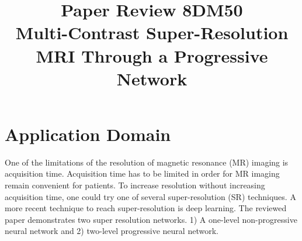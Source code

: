 \documentclass[conference]{IEEEtran}
\begin{document}
\title{Paper Review 8DM50 \\ Multi-Contrast Super-Resolution MRI Through a
  Progressive Network \cite{b1} }

\author{
\and
{}
\and
{}
\and
{}
\and
{}
}

\maketitle




\section{Application Domain}
One of the limitations of the resolution of magnetic resonance (MR) imaging is
acquisition time. Acquisition time has to be limited in order for MR imaging
remain convenient for patients. To increase resolution without increasing
acquisition time, one could try one of several super-resolution (SR) techniques.
A more recent technique to reach super-resolution is deep learning. The reviewed
paper demonstrates two super resolution networks. 1) A one-level non-progressive
neural network and 2) two-level progressive neural network.
\end{document}
